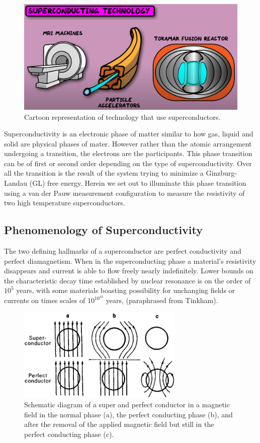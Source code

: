 \documentclass[
reprint,
amsmath,amssymb,
aps,
tikz,
border=5pt
]{revtex4-1}
\begin{document}
\begin{figure}[b]
  \includegraphics[width=0.4 \textwidth]{figures/sc_tech.png}
  \caption{Cartoon representation of technology that use superconductors.~\cite{DoScience}}
  \label{fig:sc_tech}
\end{figure}

Superconductivity is an electronic phase of matter similar to how  gas, liquid and solid are physical phases of mater. However rather than the atomic arrangement undergoing a transition, the electrons are the participants. This phase transition can be of first or second order depending on the type of superconductivity. Over all the transition is the result of the system trying to minimize a Ginzburg-Landau (GL) free energy. Herein we set out to illuminate this phase transition using a van der Pauw measurement configuration to measure the resistivity of two high temperature superconductors. 



  \subsection*{Phenomenology of Superconductivity}

    The two defining hallmarks of a superconductor are perfect conductivity and perfect diamagnetism.\cite{tinkham}  When in the superconducting phase a material's resistivity disappears and current is able to flow freely nearly indefinitely.\cite{tinkham} Lower bounds on the characteristic decay time established by nuclear resonance is on the order of $10^5$ years, with some materials boasting possibility for unchanging fields or currents on times scales of $10^{10{^{10}}}$ years, (paraphrased from Tinkham).\cite{tinkham} 

    \begin{figure}[t]
      \includegraphics[width=0.4 \textwidth]{figures/pc_sc.png}
      \caption{Schematic diagram of a super and perfect conductor in a magnetic field in the normal phase (a), the perfect conducting phase (b), and after the removal of the applied magnetic field but still in the  perfect conducting phase (c).}
      \label{fig:sc_pc}
    \end{figure}
\end{document}

